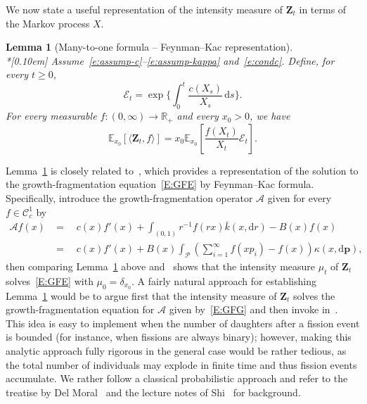 \documentclass[11pt]{article}
\newtheorem{lemm}[theo]{Lemma}
\theoremstyle{definition}
\providecommand{\mathof}[1]{\mathrm{#1}}
\numberwithin{equation}{section}
\numberwithin{figure}{section}
\numberwithin{table}{section}
\newcommand\RR{\mathbb{R}}
\newcommand\Zz{\mathbf{Z}}
\newcommand\Pp{\mathcal{P}}
\newcommand\EE{\mathbb{E}}
\newcommand\from{\colon}
\newcommand\Ee{\mathcal{E}}
\newcommand\pp{\mathbf{p}}
\newcommand\dd{\mathof{d}}
\begin{document}
We now state a useful representation of the intensity measure of $\Zz_t$ in terms of the Markov process $X$.


\begin{lemm}[Many-to-one formula -- Feynman--Kac representation] \label{L1}\ \\*[0.10em]
Assume~\eqref{e:assump-c}--\eqref{e:assump-kappa} and~\eqref{e:condc}. Define, for every $t\geq 0$,
\[
\Ee_t = \exp\biggl\{\int_0^t \frac{c(X_s)}{X_s} \, \dd s\biggr\}.
\]
For every measurable $f\from (0,\infty)\to \RR_+$ and every $x_0>0$, we have
\[
\EE_{x_0} \left[\langle \Zz_t, f\rangle \right] = x_0\EE_{x_0}\left[\frac{f(X_t)}{X_t}\Ee_t \right].
\]
\end{lemm}

Lemma~\ref{L1} is closely related to~\cite[Lemma~2.2]{BW}, which provides a representation of the solution to the growth-fragmentation equation~\eqref{E:GFE} by Feynman--Kac formula. Specifically, introduce the growth-fragmentation operator ${\mathcal A}$ given for every $f\in{\mathcal C}^1_c$ by
\begin{equation}\label{E:GFG}
\begin{aligned}
{\mathcal A}f(x) &=\quad c(x) f'(x) + \int_{(0,1)} r^{-1} f(rx) \bar k(x, \dd r) -{B}(x) f(x)  \\
&=\quad c(x) f'(x) + {B}(x) \int_{\Pp} \left(\sum_{i=1}^{\infty}f(xp_i)-f(x)\right)\kappa(x, \dd \pp),
\end{aligned}
\end{equation}
then comparing Lemma~\ref{L1} above and~\cite[Lemma~2.2]{BW} shows that the intensity measure $\mu_t$ of $\Zz_t$ solves~\eqref{E:GFE} with $\mu_0=\delta_{x_0}$. A fairly natural approach for establishing Lemma~\ref{L1} would be to argue first that the intensity measure of $\Zz_t$ solves the growth-fragmentation equation for ${\mathcal A}$ given by~\eqref{E:GFG} and then invoke in~\cite[Lemma~2.2]{BW}. This idea is easy to implement when the number of daughters after a fission event is bounded (for instance, when fissions are always binary); however, making this analytic approach fully rigorous in the general case would be rather tedious, as the total number of individuals may explode in finite time and thus fission events accumulate. We rather follow a classical probabilistic approach and refer to the treatise by Del Moral~\cite{Delmoral} and the lecture notes of Shi~\cite{Shi} for background.
\end{document}
